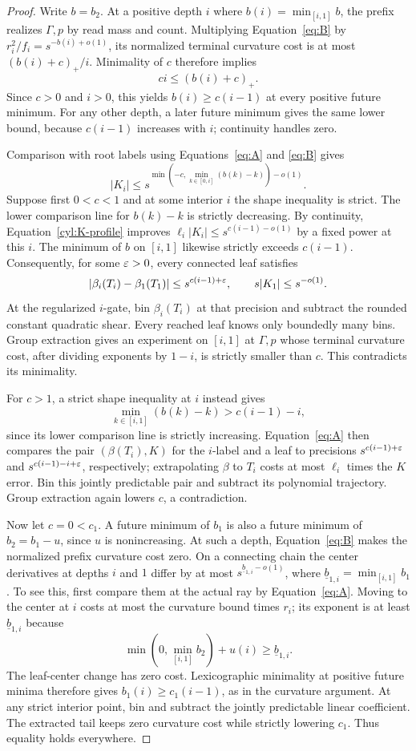 \begin{proof}
Write $b=b_2$.  At a positive depth $i$ where $b(i)=\min_{[i,1]}b$,
the prefix realizes $\Gamma,p$ by read mass and count.  Multiplying
Equation~\eqref{eq:B} by $r_i^2/f_i=s^{-b(i)+o(1)}$, its normalized
terminal curvature cost is at most $(b(i)+c)_+/i$.  Minimality of $c$
therefore implies
\[
 ci\le(b(i)+c)_+.
\]
Since $c>0$ and $i>0$, this yields $b(i)\ge c(i-1)$ at every positive
future minimum.  For any other depth, a later future minimum gives the
same lower bound, because $c(i-1)$ increases with $i$; continuity handles
zero.

Comparison with root labels using Equations~\eqref{eq:A} and
\eqref{eq:B} gives
\begin{equation}\label{cyl:K-profile}
 |K_i|\le s^{\min(-c,\min_{k\in[0,i]}(b(k)-k))-o(1)}.
\end{equation}
Suppose first $0<c<1$ and at some interior $i$ the shape inequality is
strict.  The lower comparison line for $b(k)-k$ is strictly decreasing.
By continuity, Equation~\eqref{cyl:K-profile} improves
$\ell_i|K_i|\le s^{c(i-1)-o(1)}$ by a fixed power at this $i$.
The minimum of $b$ on $[i,1]$ likewise strictly exceeds $c(i-1)$.
Consequently, for some $\varepsilon>0$, every connected leaf satisfies
\[
 |\beta_i(T_i)-\beta_1(T_1)|\le s^{c(i-1)+\varepsilon},
 \qquad s|K_1|\le s^{-o(1)}.
\]
At the regularized $i$-gate, bin $\beta_i(T_i)$ at that precision and
subtract the rounded constant quadratic shear.  Every reached leaf
knows only boundedly many bins.  Group extraction gives an experiment
on $[i,1]$ at $\Gamma,p$ whose terminal curvature cost, after dividing
exponents by $1-i$, is strictly smaller than $c$.  This contradicts its
minimality.

For $c>1$, a strict shape inequality at $i$ instead gives
\[
 \min_{k\in[i,1]}(b(k)-k)>c(i-1)-i,
\]
since its lower comparison line is strictly increasing.  Equation~\eqref{eq:A}
then compares the pair $(\beta(T_i),K)$ for the $i$-label and a leaf to
precisions $s^{c(i-1)+\varepsilon}$ and $s^{c(i-1)-i+\varepsilon}$, respectively;
extrapolating $\beta$ to $T_i$ costs at most $\ell_i$ times the $K$
error.  Bin this jointly predictable pair and subtract its polynomial
trajectory.  Group extraction again lowers $c$, a contradiction.

Now let $c=0<c_1$.  A future minimum of $b_1$ is also a future minimum
of $b_2=b_1-u$, since $u$ is nonincreasing.  At such a depth,
Equation~\eqref{eq:B} makes the normalized prefix curvature cost zero.
On a connecting chain the center derivatives at depths $i$ and $1$
differ by at most $s^{\underline b_{1,i}-o(1)}$, where
$\underline b_{1,i}=\min_{[i,1]}b_1$.  To see this, first compare them
at the actual ray by Equation~\eqref{eq:A}.  Moving to the center at
$i$ costs at most the curvature bound times $r_i$; its exponent is
at least $\underline b_{1,i}$ because
\[
 \min(0,\min_{[i,1]}b_2)+u(i)\ge\underline b_{1,i}.
\]
The leaf-center change has zero cost.  Lexicographic minimality at
positive future minima therefore gives
$b_1(i)\ge c_1(i-1)$, as in the curvature argument.  At any strict
interior point, bin and subtract the jointly predictable linear
coefficient.  The extracted tail keeps zero curvature cost while
strictly lowering $c_1$.  Thus equality holds everywhere.


\end{proof}

